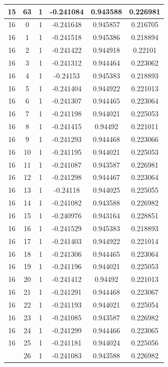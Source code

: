 \documentclass[12pt,a4paper]{article}
\numberwithin{equation}{section}
\numberwithin{figure}{section}
\numberwithin{table}{section}
\begin{document}
\begin{longtable}{|c|c|c|c|c|c|}
15 & 63 & 1 & -0.241084 & 0.943588 & 0.226981 \\ \hline
16 & 0 & 1 & -0.241648 & 0.945857 & 0.216705 \\ \hline
16 & 1 & 1 & -0.241518 & 0.945386 & 0.218894 \\ \hline
16 & 2 & 1 & -0.241422 & 0.944918 & 0.22101 \\ \hline
16 & 3 & 1 & -0.241312 & 0.944464 & 0.223062 \\ \hline
16 & 4 & 1 & -0.24153 & 0.945383 & 0.218893 \\ \hline
16 & 5 & 1 & -0.241404 & 0.944922 & 0.221013 \\ \hline
16 & 6 & 1 & -0.241307 & 0.944465 & 0.223064 \\ \hline
16 & 7 & 1 & -0.241198 & 0.944021 & 0.225053 \\ \hline
16 & 8 & 1 & -0.241415 & 0.94492 & 0.221011 \\ \hline
16 & 9 & 1 & -0.241293 & 0.944468 & 0.223066 \\ \hline
16 & 10 & 1 & -0.241195 & 0.944021 & 0.225053 \\ \hline
16 & 11 & 1 & -0.241087 & 0.943587 & 0.226981 \\ \hline
16 & 12 & 1 & -0.241298 & 0.944467 & 0.223064 \\ \hline
16 & 13 & 1 & -0.24118 & 0.944025 & 0.225055 \\ \hline
16 & 14 & 1 & -0.241082 & 0.943588 & 0.226982 \\ \hline
16 & 15 & 1 & -0.240976 & 0.943164 & 0.228851 \\ \hline
16 & 16 & 1 & -0.241529 & 0.945383 & 0.218893 \\ \hline
16 & 17 & 1 & -0.241403 & 0.944922 & 0.221014 \\ \hline
16 & 18 & 1 & -0.241306 & 0.944465 & 0.223064 \\ \hline
16 & 19 & 1 & -0.241196 & 0.944021 & 0.225053 \\ \hline
16 & 20 & 1 & -0.241412 & 0.94492 & 0.221013 \\ \hline
16 & 21 & 1 & -0.241291 & 0.944468 & 0.223067 \\ \hline
16 & 22 & 1 & -0.241193 & 0.944021 & 0.225054 \\ \hline
16 & 23 & 1 & -0.241085 & 0.943587 & 0.226982 \\ \hline
16 & 24 & 1 & -0.241299 & 0.944466 & 0.223065 \\ \hline
16 & 25 & 1 & -0.241181 & 0.944024 & 0.225056 \\ \hline
\pagebreak
16 & 26 & 1 & -0.241083 & 0.943588 & 0.226982 \\ \hline

\end{longtable}
\end{document}
